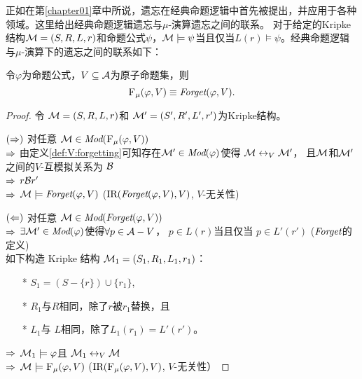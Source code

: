 正如在第\ref{chapter01}章中所说，遗忘在经典命题逻辑中首先被提出，并应用于各种领域。这里给出经典命题逻辑遗忘与$\mu$-演算遗忘之间的联系。
对于给定的Kripke结构${\cal M} = (S, R, L, r)$和命题公式$\psi$，${\cal M} \models  \psi$当且仅当$L(r) \models \psi$。经典命题逻辑与$\mu$-演算下的遗忘之间的联系如下：
\begin{theorem}\label{thm:PL:CTL}
	令$\varphi$为命题公式，$V\subseteq {\cal A}$为原子命题集，则
	\[
	{\textsc{F}_{\textsc{$\mu$}}}(\varphi, V) \equiv \textit{Forget}(\varphi, V).
	\]
\end{theorem}
\begin{proof}
	令 ${\cal M} = (S, R, L, r)$和 ${\cal M}' = (S', R', L', r')$为Kripke结构。
	
	$(\Rightarrow)$ 对任意 ${\cal M} \in \textit{Mod}({\textsc{F}_{\textsc{$\mu$}}}(\varphi, V))$ \\
	$\Rightarrow$ 由定义\ref{def:V:forgetting}可知存在${\cal M}' \in \textit{Mod}(\varphi)$使得 ${\cal M} \leftrightarrow_V {\cal M}'$， %
	且${\cal M}$和${\cal M}'$之间的$V$-互模拟关系为 ${\cal B}$\\
	$\Rightarrow$ $r {\cal B} r'$ \\
	$\Rightarrow$ ${\cal M} \models \textit{Forget}(\varphi, V)$ \hfill ($\textrm{IR}(\textit{Forget}(\varphi, V),V)$, $V$-无关性)
	
	$(\Leftarrow)$ 对任意 ${\cal M} \in \textit{Mod}(\textit{Forget}(\varphi, V))$ \\
	$\Rightarrow$ $\exists {\cal M}' \in\textit{Mod}(\varphi)$使得$\forall p \in {\cal A}-V$， $p \in L(r)$当且仅当 $p \in L'(r')$ \hfill ($\textit{Forget}$的定义)\\
	
	如下构造 Kripke 结构 ${\cal M}_1 = (S_1, R_1, L_1, r_1)$：
	\begin{itemize}
		\item[*] $S_1 = (S - \{r\}) \cup \{r_1\}$,
		\item[*] $R_1$与$R$相同，除了$r$被$r_1$替换，且
		\item[*] $L_1$与 $L$相同，除了$L_1(r_1) = L'(r')$。
	\end{itemize}
	$\Rightarrow$ ${\cal M}_1 \models \varphi$且 ${\cal M}_1 \leftrightarrow_V {\cal M}$\\
	$\Rightarrow$ ${\cal M} \models {\textsc{F}_{\textsc{$\mu$}}}(\varphi, V)$ \hfill ($\textrm{IR}({\textsc{F}_{\textsc{$\mu$}}}(\varphi, V), V)$, $V$-无关性）
\end{proof}

